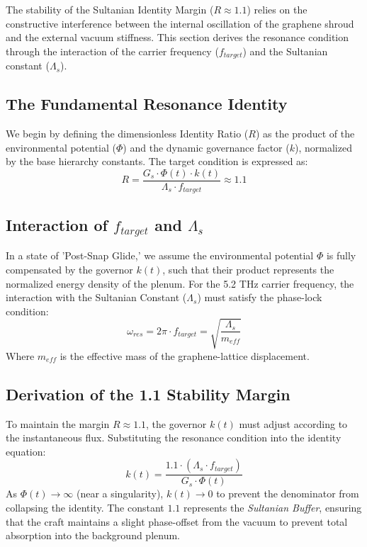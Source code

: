 \documentclass[11pt]{article}
\begin{document}
The stability of the Sultanian Identity Margin ($R \approx 1.1$) relies on the constructive interference between the internal oscillation of the graphene shroud and the external vacuum stiffness. This section derives the resonance condition through the interaction of the carrier frequency ($f_{target}$) and the Sultanian constant ($\Lambda_s$).

\subsection{The Fundamental Resonance Identity}
We begin by defining the dimensionless Identity Ratio ($R$) as the product of the environmental potential ($\Phi$) and the dynamic governance factor ($k$), normalized by the base hierarchy constants. The target condition is expressed as:
\begin{equation}
    R = \frac{G_s \cdot \Phi(t) \cdot k(t)}{\Lambda_s \cdot f_{target}} \approx 1.1
\end{equation}

\subsection{Interaction of $f_{target}$ and $\Lambda_s$}
In a state of 'Post-Snap Glide,' we assume the environmental potential $\Phi$ is fully compensated by the governor $k(t)$, such that their product represents the normalized energy density of the plenum. For the 5.2 THz carrier frequency, the interaction with the Sultanian Constant ($\Lambda_s$) must satisfy the phase-lock condition:
\begin{equation}
    \omega_{res} = 2\pi \cdot f_{target} = \sqrt{\frac{\Lambda_s}{m_{eff}}}
\end{equation}
Where $m_{eff}$ is the effective mass of the graphene-lattice displacement. 

\subsection{Derivation of the 1.1 Stability Margin}
To maintain the margin $R \approx 1.1$, the governor $k(t)$ must adjust according to the instantaneous flux. Substituting the resonance condition into the identity equation:
\begin{equation}
    k(t) = \frac{1.1 \cdot (\Lambda_s \cdot f_{target})}{G_s \cdot \Phi(t)}
\end{equation}
As $\Phi(t) \to \infty$ (near a singularity), $k(t) \to 0$ to prevent the denominator from collapsing the identity. The constant $1.1$ represents the \textit{Sultanian Buffer}, ensuring that the craft maintains a slight phase-offset from the vacuum to prevent total absorption into the background plenum.
\end{document}
